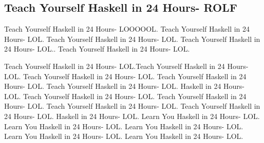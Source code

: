 \subsection{Teach Yourself Haskell in 24 Hours- ROLF}

Teach Yourself Haskell in 24 Hours- LOOOOOL. Teach Yourself Haskell in 24 Hours- LOL. Teach Yourself Haskell in 24 Hours- LOL. Teach Yourself Haskell in 24 Hours- LOL.. Teach Yourself Haskell in 24 Hours- LOL.

Teach Yourself Haskell in 24 Hours- LOL.Teach Yourself Haskell in 24 Hours- LOL. Teach Yourself Haskell in 24 Hours- LOL. Teach Yourself Haskell in 24 Hours- LOL.
Teach Yourself Haskell in 24 Hours- LOL.  Haskell in 24 Hours- LOL. Teach Yourself Haskell in 24 Hours- LOL. Teach Yourself Haskell in 24 Hours- LOL. Teach Yourself Haskell in 24 Hours- LOL. Teach Yourself Haskell in 24 Hours- LOL.  Haskell in 24 Hours- LOL. Learn You Haskell in 24 Hours- LOL. Learn You Haskell in 24 Hours- LOL. Learn You Haskell in 24 Hours- LOL. Learn You Haskell in 24 Hours- LOL. Learn You Haskell in 24 Hours- LOL.